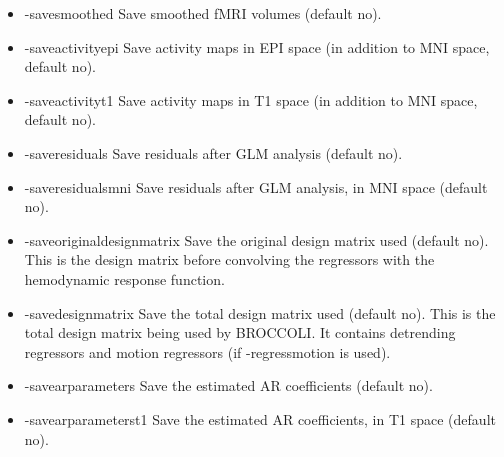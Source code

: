 \begin{itemize}
\item -savesmoothed              
\newline \newline Save smoothed fMRI volumes (default no). 

\newpage

\item -saveactivityepi           
\newline \newline Save activity maps in EPI space \newline (in addition to MNI space, default no). 

\item -saveactivityt1            
\newline \newline Save activity maps in T1 space \newline (in addition to MNI space, default no). 

\item -saveresiduals             
\newline \newline Save residuals after GLM analysis (default no). 

\item -saveresidualsmni          
\newline \newline Save residuals after GLM analysis, in MNI space (default no). 

\item -saveoriginaldesignmatrix  
\newline \newline Save the original design matrix used (default no). This is the design matrix before convolving the regressors with the hemodynamic response function.

\item -savedesignmatrix          
\newline \newline Save the total design matrix used (default no). This is the total design matrix being used by BROCCOLI. It contains detrending regressors and motion regressors (if -regressmotion is used).

\item -savearparameters          
\newline \newline Save the estimated AR coefficients (default no). 

\item -savearparameterst1        
\newline \newline Save the estimated AR coefficients, in T1 space (default no). 


\end{itemize}
